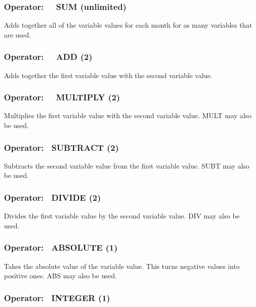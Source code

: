 \subsubsection{Operator:~~ SUM (unlimited)}\label{operator-sum-unlimited}

Adds together all of the variable values for each month for as many variables that are used.

\subsubsection{Operator:~~ ADD (2)}\label{operator-add-2}

Adds together the first variable value with the second variable value.

\subsubsection{Operator:~~ MULTIPLY (2)}\label{operator-multiply-2}

Multiplies the first variable value with the second variable value. MULT may also be used.

\subsubsection{Operator:~ SUBTRACT (2)}\label{operator-subtract-2}

Subtracts the second variable value from the first variable value. SUBT may also be used.

\subsubsection{Operator:~ DIVIDE (2)}\label{operator-divide-2}

Divides the first variable value by the second variable value. DIV may also be used.

\subsubsection{Operator:~ ABSOLUTE (1)}\label{operator-absolute-1}

Takes the absolute value of the variable value. This turns negative values into positive ones. ABS may also be used.

\subsubsection{Operator:~ INTEGER (1)}\label{operator-integer-1}

